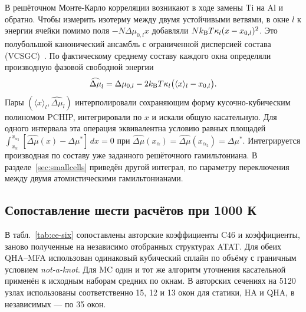 \documentclass[11pt,a4paper]{article}
\begin{document}
В решёточном Монте-Карло корреляции возникают в ходе замены Ti на Al
и обратно. Чтобы измерить изотерму между двумя устойчивыми ветвями,
в окне \(l\) к энергии ячейки помимо поля \(-N\Delta\mu_{0,l}x\)
добавляли \(Nk_{\rm B}T\kappa_l(x-x_{0,l})^2\). Это полубольшой
канонический ансамбль с ограниченной дисперсией состава (VCSGC)~\cite{sadigh2012}.
По фактическому среднему составу каждого окна определяли производную
фазовой свободной энергии
\[
 \widehat{\Delta\mu}_l=\Delta\mu_{0,l}
              -2k_{\rm B}T\kappa_l\big(\langle x\rangle_l-x_{0,l}\big).
\]
Пары \((\langle x\rangle_l,\widehat{\Delta\mu}_l)\)
интерполировали сохраняющим форму кусочно-кубическим полиномом PCHIP,
интегрировали по \(x\) и искали общую касательную. Для одного интервала
эта операция эквивалентна условию равных площадей
\(\int_{x_\alpha}^{x_{\alpha_2}}[\widehat{\Delta\mu}(x)-\Delta\mu^*]\,dx=0\)
при \(\widehat{\Delta\mu}(x_\alpha)=\widehat{\Delta\mu}(x_{\alpha_2})=\Delta\mu^*\).
Интегрируется производная по составу уже заданного решёточного гамильтониана.
В разделе~\ref{sec:smallcells} приведён другой интеграл, по параметру
переключения между двумя атомистическими гамильтонианами.

\subsection{Сопоставление шести расчётов при 1000 К}
В табл.~\ref{tab:ce-six} сопоставлены авторские коэффициенты C46 и
коэффициенты, заново полученные на независимо отобранных структурах ATAT.
Для обеих QHA--MFA использован одинаковый кубический сплайн по объёму
с граничным условием \textit{not-a-knot}. Для MC один и тот же алгоритм
уточнения касательной применён к исходным наборам средних по окнам.
В авторских сечениях на 5120 узлах использованы соответственно 15, 12 и
13 окон для статики, HA и QHA, в независимых --- по 35 окон.
\end{document}
